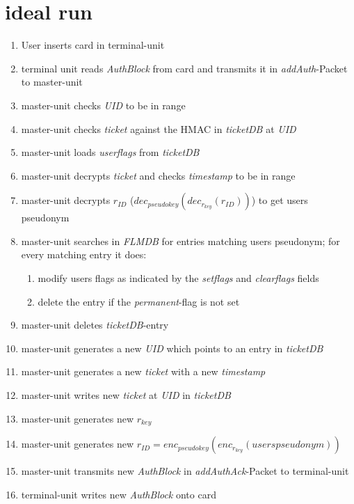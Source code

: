 \section{ideal run}
 \begin{enumerate}
 \item User inserts card in terminal-unit
 \item terminal unit reads \textit{AuthBlock} from card and transmits it in \textit{addAuth}-Packet to master-unit
 \item master-unit checks \textit{UID} to be in range
 \item master-unit checks \textit{ticket} against the HMAC in \textit{ticketDB} at \textit{UID}
 \item master-unit loads \textit{userflags} from \textit{ticketDB}
 \item master-unit decrypts \textit{ticket} and checks \textit{timestamp} to be in range
 \item master-unit decrypts \textit{$r_{ID}$} ($dec_{pseudokey}(dec_{r_{key}}(r_{ID}))$) to get users pseudonym
 \item master-unit searches in \textit{FLMDB} for entries matching users pseudonym; for every matching entry it does:
  \begin{enumerate}
  \item modify users flags as indicated by the \textit{setflags} and \textit{clearflags} fields
  \item delete the entry if the \textit{permanent}-flag is not set
  \end{enumerate}
 \item master-unit deletes \textit{ticketDB}-entry
 \item master-unit generates a new \textit{UID} which points to an entry in \textit{ticketDB}
 \item master-unit generates a new \textit{ticket} with a new \textit{timestamp}
 \item master-unit writes new \textit{ticket} at \textit{UID} in \textit{ticketDB}
 \item master-unit generates new \textit{$r_{key}$}
 \item master-unit generates new \textit{$r_{ID}$}$=enc_{pseudokey}(enc_{r_{key}}(users pseudonym))$ 
 \item master-unit transmits new \textit{AuthBlock} in \textit{addAuthAck}-Packet to terminal-unit
 \item terminal-unit writes new \textit{AuthBlock} onto card
 \end{enumerate}
